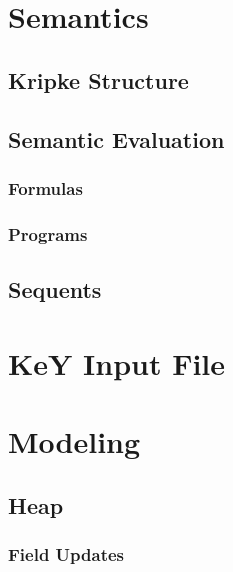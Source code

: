 \documentclass[a4paper, 11pt, accentcolor = tud3b]{tudreport}
\begin{document}
		\section{Semantics} %

			\subsection{Kripke Structure} %

			\subsection{Semantic Evaluation} %

				\subsubsection{Formulas} %

				\subsubsection{Programs} %

			\subsection{Sequents} %

		\section{KeY Input File} %

		\section{Modeling} %

			\subsection{Heap} %

				\subsubsection{Field Updates} %
\end{document}
